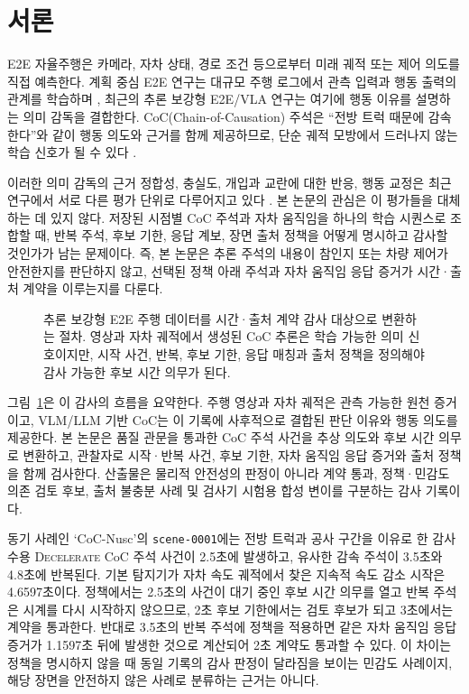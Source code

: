 \section{서론}
\label{sec:intro}

E2E 자율주행은 카메라, 자차 상태, 경로 조건 등으로부터 미래 궤적 또는 제어 의도를 직접 예측한다. 계획 중심 E2E 연구는 대규모 주행 로그에서 관측 입력과 행동 출력의 관계를 학습하며 \cite{hu2023uniad,jiang2023vad}, 최근의 추론 보강형 E2E/VLA 연구는 여기에 행동 이유를 설명하는 의미 감독을 결합한다. CoC(Chain-of-Causation) 주석은 ``전방 트럭 때문에 감속한다''와 같이 행동 의도와 근거를 함께 제공하므로, 단순 궤적 모방에서 드러나지 않는 학습 신호가 될 수 있다 \cite{sima2024drivelm,tian2024drivevlm,wang2025alpamayo}.

이러한 의미 감독의 근거 정합성, 충실도, 개입과 교란에 대한 반응, 행동 교정은 최근 연구에서 서로 다른 평가 단위로 다루어지고 있다 \cite{xie2025drivebench,zhang2023cat,nvidia2026autolabeler}. 본 논문의 관심은 이 평가들을 대체하는 데 있지 않다. 저장된 시점별 CoC 주석과 자차 움직임을 하나의 학습 시퀀스로 조합할 때, 반복 주석, 후보 기한, 응답 계보, 장면 출처 정책을 어떻게 명시하고 감사할 것인가가 남는 문제이다. 즉, 본 논문은 추론 주석의 내용이 참인지 또는 차량 제어가 안전한지를 판단하지 않고, 선택된 정책 아래 주석과 자차 움직임 응답 증거가 시간·출처 계약을 이루는지를 다룬다.

\begin{figure}[t]
\centering

\caption{추론 보강형 E2E 주행 데이터를 시간·출처 계약 감사 대상으로 변환하는 절차. 영상과 자차 궤적에서 생성된 CoC 추론은 학습 가능한 의미 신호이지만, 시작 사건, 반복, 후보 기한, 응답 매칭과 출처 정책을 정의해야 감사 가능한 후보 시간 의무가 된다.}
\label{fig:overview-pipeline}
\end{figure}

그림~\ref{fig:overview-pipeline}은 이 감사의 흐름을 요약한다. 주행 영상과 자차 궤적은 관측 가능한 원천 증거이고, VLM/LLM 기반 CoC는 이 기록에 사후적으로 결합된 판단 이유와 행동 의도를 제공한다. 본 논문은 품질 관문을 통과한 CoC 주석 사건을 추상 의도와 후보 시간 의무로 변환하고, \uppaal 관찰자로 시작·반복 사건, 후보 기한, 자차 움직임 응답 증거와 출처 정책을 함께 검사한다. 산출물은 물리적 안전성의 판정이 아니라 계약 통과, 정책·민감도 의존 검토 후보, 출처 불충분 사례 및 검사기 시험용 합성 변이를 구분하는 감사 기록이다.

동기 사례인 `CoC-Nusc'의 \texttt{scene-0001}에는 전방 트럭과 공사 구간을 이유로 한 감사 수용 \textsc{Decelerate} CoC 주석 사건이 2.5초에 발생하고, 유사한 감속 주석이 3.5초와 4.8초에 반복된다. 기본 탐지기가 자차 속도 궤적에서 찾은 지속적 속도 감소 시작은 4.6597초이다. \preserve 정책에서는 2.5초의 사건이 대기 중인 후보 시간 의무를 열고 반복 주석은 시계를 다시 시작하지 않으므로, 2초 후보 기한에서는 검토 후보가 되고 3초에서는 계약을 통과한다. 반대로 3.5초의 반복 주석에 \reset 정책을 적용하면 같은 자차 움직임 응답 증거가 1.1597초 뒤에 발생한 것으로 계산되어 2초 계약도 통과할 수 있다. 이 차이는 정책을 명시하지 않을 때 동일 기록의 감사 판정이 달라짐을 보이는 민감도 사례이지, 해당 장면을 안전하지 않은 사례로 분류하는 근거는 아니다.

